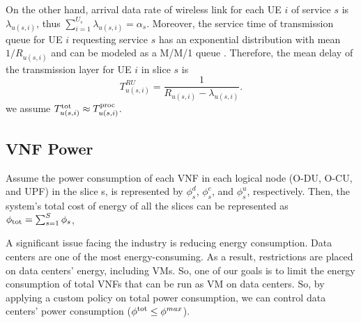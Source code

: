 \documentclass[lettersize,journal]{IEEEtran}
\begin{document}
On the other hand, arrival data rate of wireless link for each UE $i$ of service $s$ is $\lambda_{u(s,i)}$, thus $\sum_{i = 1}^{U_s} \lambda_{u(s,i)} = \alpha_s$.
Moreover, the service time of transmission queue for UE $i$ requesting service $s$ has
an exponential distribution with mean $1/R_{u(s,i)}$ and can be modeled as a M/M/1 queue \cite{SystemCostMinimization,luong2018joint,luong2018novel}.
Therefore, the mean delay of the transmission layer for UE $i$ in slice $s$ is
\begin{equation}
 T_{u(s,i)}^{RU} = \frac{1}{R_{u(s,i)} - \lambda_{u(s,i)}}.
\end{equation}
we assume $T^{\text{\text{tot}}}_{u(s,i)} \approx T^{\text{proc}}_{u(s,i)} $. %
\subsection{VNF Power}
Assume the power consumption of each VNF in each logical node (O-DU, O-CU, and UPF) in the slice s, is represented by $\phi_{s}^d$, $\phi_{s}^c$, and $\phi_{s}^u$, respectively.
Then, the system's total cost of energy of all the slices can be represented as $\textstyle \phi_{\text{\text{tot}}} = \sum_{s=1}^{S}\phi_{s}$,

A significant issue facing the industry is reducing energy consumption. Data centers are one of the most energy-consuming. As a result, restrictions are placed on data centers' energy, including VMs. So, one of our goals is to limit the energy consumption of total VNFs that can be run as VM on data centers. So, by applying a custom policy on total power consumption, we can control data centers' power consumption ($\phi^{\text{\text{tot}}}  \leq \phi^{max}$).
\end{document}
